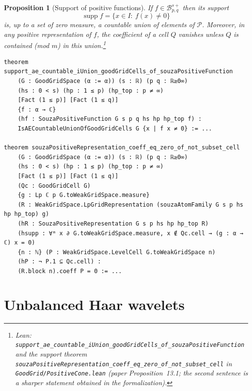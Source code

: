 \documentclass[11pt]{amsart}
\newtheorem{proposition}[theorem]{Proposition}
\theoremstyle{definition}
\newcommand{\lean}[1]{\texttt{#1}}
\begin{document}
\begin{proposition}[Support of positive functions]\label{possupp}
If $f \in \mathcal{B}^{s+}_{p,q}$ then its support
$$\operatorname{supp} f = \{ x\in I\colon \ f(x)\neq 0\}$$
is, up to a set of zero measure, a countable union of elements of
$\mathcal{P}$. Moreover, in any positive representation of $f$, the
coefficient of a cell $Q$ vanishes unless $Q$ is contained (mod $m$) in this
union.\footnote{Lean:
\lean{support\_ae\_countable\_iUnion\_goodGridCells\_of\_souzaPositiveFunction}
and the support theorem
\lean{souzaPositiveRepresentation\_coeff\_eq\_zero\_of\_not\_subset\_cell} in
\lean{GoodGrid/PositiveCone.lean} (paper Proposition~13.1; the second
sentence is a sharper statement obtained in the formalization).}
\end{proposition}
\begin{lstlisting}[style=lean]
theorem support_ae_countable_iUnion_goodGridCells_of_souzaPositiveFunction
    (G : GoodGridSpace (α := α)) (s : ℝ) (p q : ℝ≥0∞)
    (hs : 0 < s) (hp : 1 ≤ p) (hp_top : p ≠ ∞)
    [Fact (1 ≤ p)] [Fact (1 ≤ q)]
    {f : α → ℂ}
    (hf : SouzaPositiveFunction G s p q hs hp hp_top f) :
    IsAECountableUnionOfGoodGridCells G {x | f x ≠ 0} := ...

theorem souzaPositiveRepresentation_coeff_eq_zero_of_not_subset_cell
    (G : GoodGridSpace (α := α)) (s : ℝ) (p q : ℝ≥0∞)
    (hs : 0 < s) (hp : 1 ≤ p) (hp_top : p ≠ ∞)
    [Fact (1 ≤ p)] [Fact (1 ≤ q)]
    (Qc : GoodGridCell G)
    {g : Lp ℂ p G.toWeakGridSpace.measure}
    (R : WeakGridSpace.LpGridRepresentation (souzaAtomFamily G s p hs hp hp_top) g)
    (hR : SouzaPositiveRepresentation G s p hs hp hp_top R)
    (hsupp : ∀ᵐ x ∂ G.toWeakGridSpace.measure, x ∉ Qc.cell → (g : α → ℂ) x = 0)
    {n : ℕ} (P : WeakGridSpace.LevelCell G.toWeakGridSpace n)
    (hP : ¬ P.1 ⊆ Qc.cell) :
    (R.block n).coeff P = 0 := ...
\end{lstlisting}

\section{Unbalanced Haar wavelets}\label{haar}
\end{document}
